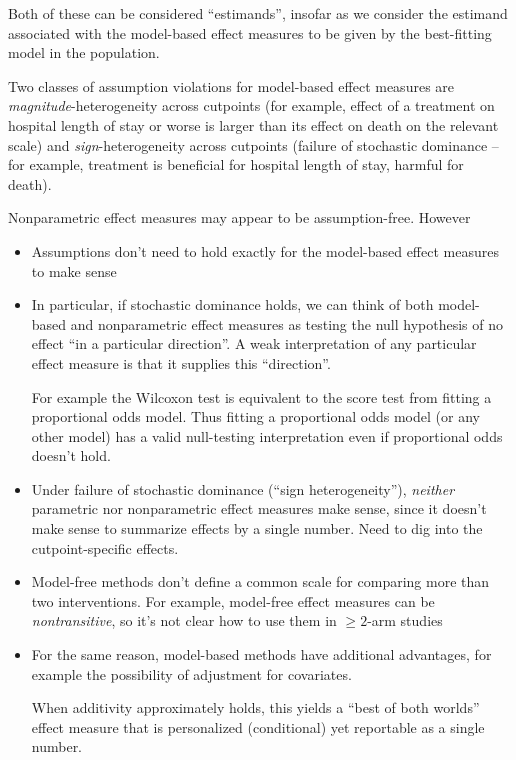 \documentclass[
  11pt,
  fleqn
]{article}
\begin{document}
Both of these can be considered ``estimands'', insofar as we consider the
estimand associated with the model-based effect measures to be given by the
best-fitting model in the population.

Two classes of assumption violations for model-based effect measures
are \emph{magnitude}-heterogeneity across cutpoints (for example,
  effect of a treatment on hospital length of stay or worse is larger
  than its effect on
death on the relevant scale) and
\emph{sign}-heterogeneity
across cutpoints (failure of stochastic dominance -- for example,
treatment is beneficial for hospital length of stay, harmful for death).

Nonparametric effect measures may appear to be assumption-free. However

\begin{itemize}
  \item Assumptions don't need to hold exactly for the model-based
    effect measures to make sense
  \item In particular, if stochastic dominance holds, we can think of
    both model-based and nonparametric effect measures as
    testing the null hypothesis of no effect ``in a particular
    direction''. A weak interpretation of any particular
    effect measure
    is that it supplies this ``direction''.

    For example the Wilcoxon test is
    equivalent to the score test from fitting a proportional odds model.
    Thus fitting a proportional odds model (or any other model) has a
    valid null-testing
    interpretation even if proportional odds doesn't hold.
  \item Under failure of stochastic dominance (``sign
    heterogeneity''), \emph{neither} parametric nor nonparametric
    effect measures make sense, since it doesn't make sense to
    summarize effects by a single number. Need to dig into the
    cutpoint-specific effects.
  \item Model-free methods don't define a common scale for comparing
    more than two interventions. For example, model-free effect
    measures can be \emph{nontransitive}, so it's not clear how to
    use them in $\geq 2$-arm studies
  \item For the same reason, model-based methods have additional
    advantages, for example
    the possibility of adjustment for covariates.

    When additivity approximately holds, this yields a ``best of both
    worlds'' effect measure that is
    personalized (conditional) yet reportable as a single
    number.
\end{itemize}
\end{document}
